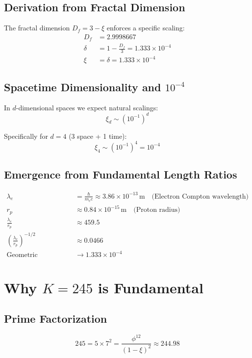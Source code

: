	\subsection{Derivation from Fractal Dimension}
	
	The fractal dimension $D_f = 3 - \xi$ enforces a specific scaling:
	\begin{align}
		D_f &= 2.9998667 \\
		\delta &= 1 - \frac{D_f}{3} = 1.333 \times 10^{-4} \\
		\xi &= \delta = 1.333 \times 10^{-4}
	\end{align}
	
	\subsection{Spacetime Dimensionality and $10^{-4}$}
	
	In $d$-dimensional spaces we expect natural scalings:
	\begin{equation}
		\xi_d \sim (10^{-1})^d
	\end{equation}
	
	Specifically for $d=4$ (3 space + 1 time):
	\begin{equation}
		\xi_4 \sim (10^{-1})^4 = 10^{-4}
	\end{equation}
	
	\subsection{Emergence from Fundamental Length Ratios}
	
	\begin{align}
		\lambda_e &= \frac{\hbar}{m_e c} \approx 3.86 \times 10^{-13} \, \text{m} \quad \text{(Electron Compton wavelength)} \\
		r_p &\approx 0.84 \times 10^{-15} \, \text{m} \quad \text{(Proton radius)} \\
		\frac{\lambda_e}{r_p} &\approx 459.5 \\
		\left(\frac{\lambda_e}{r_p}\right)^{-1/2} &\approx 0.0466 \\
		\text{Geometric correction} &\rightarrow 1.333 \times 10^{-4}
	\end{align}
	
	\section{Why $K = 245$ is Fundamental}
	
	\subsection{Prime Factorization}
	\begin{equation}
		245 = 5 \times 7^2 = \frac{\phi^{12}}{(1 - \xi)^2} \approx 244.98
	\end{equation}
	
